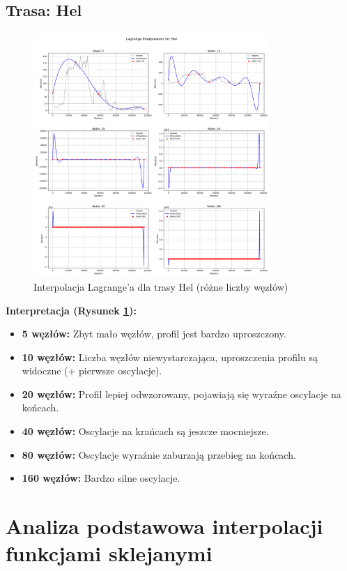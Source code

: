 \documentclass[11pt,a4paper]{article}
\begin{document}
\subsection{Trasa: Hel}
\begin{figure}[H]
    \centering
    \includegraphics[width=0.8\textwidth]{../plots/Hel_Lagrange_basic.png}
    \caption{Interpolacja Lagrange'a dla trasy Hel (różne liczby węzłów)}
    \label{fig:hel_lagrange}
\end{figure}
\textbf{Interpretacja (Rysunek \ref{fig:hel_lagrange}):} 
\begin{itemize}
    \item \textbf{5 węzłów:} Zbyt mało węzłów, profil jest bardzo uproszczony.
    \item \textbf{10 węzłów:} Liczba węzłów niewystarczająca, uproszczenia profilu są widoczne (+ pierwsze oscylacje).
    \item \textbf{20 węzłów:} Profil lepiej odwzorowany, pojawiają się wyraźne oscylacje na końcach.
    \item \textbf{40 węzłów:} Oscylacje na krańcach są jeszcze mocniejsze.
    \item \textbf{80 węzłów:} Oscylacje wyraźnie zaburzają przebieg na końcach.
    \item \textbf{160 węzłów:} Bardzo silne oscylacje.
\end{itemize}

\section{Analiza podstawowa interpolacji funkcjami sklejanymi}
\end{document}
